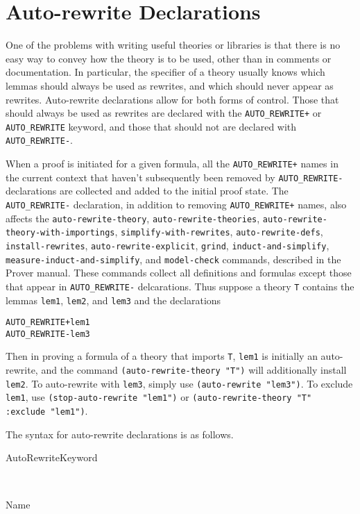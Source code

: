
\section{Auto-rewrite Declarations}
\label{auto-rewrite-decls}

One of the problems with writing useful theories or libraries is that
there is no easy way to convey how the theory is to be used, other than in
comments or documentation.  In particular, the specifier of a theory
usually knows which lemmas should always be used as rewrites, and which
should never appear as rewrites.  Auto-rewrite declarations allow for both
forms of control.  Those that should always be used as rewrites are
declared with the \texttt{AUTO\_REWRITE+} or \texttt{AUTO\_REWRITE}
keyword, and those that should not are declared with
\texttt{AUTO\_REWRITE-}.  

When a proof is initiated for a given formula, all the
\texttt{AUTO\_REWRITE+} names in the current context that haven't
subsequently been removed by \texttt{AUTO\_REWRITE-} declarations are
collected and added to the initial proof state.  The
\texttt{AUTO\_REWRITE-} declaration, in addition to removing
\texttt{AUTO\_REWRITE+} names, also affects the
\texttt{auto-rewrite-theory}, \texttt{auto-rewrite-theories},
\texttt{auto-rewrite-theory-with-importings},
\texttt{simplify-with-rewrites}, \texttt{auto-rewrite-defs},
\texttt{install-rewrites}, \texttt{auto-rewrite-explicit}, \texttt{grind},
\texttt{induct-and-simplify}, \texttt{measure-induct-and-simplify}, and
\texttt{model-check} commands, described in the Prover manual.  These
commands collect all definitions and formulas except those that appear in
\texttt{AUTO\_REWRITE-} delcarations.  Thus suppose a theory \texttt{T}
contains the lemmas \texttt{lem1}, \texttt{lem2}, and \texttt{lem3} and
the declarations
\begin{alltt}
  AUTO_REWRITE+ lem1
  AUTO_REWRITE- lem3
\end{alltt}
Then in proving a formula of a theory that imports \texttt{T},
\texttt{lem1} is initially an auto-rewrite, and the command
\texttt{(auto-rewrite-theory "T")} will additionally install
\texttt{lem2}.  To auto-rewrite with \texttt{lem3}, simply use
\texttt{(auto-rewrite "lem3")}.  To exclude \texttt{lem1}, use
\texttt{(stop-auto-rewrite "lem1")} or \texttt{(auto-rewrite-theory "T"
:exclude "lem1")}.

The syntax for auto-rewrite declarations is as follows.
\begin{bnf}
{AutoRewriteKeyword\ }

{\ \choice\ \ \choice\ }

{Name \opt{\lit{!} \opt{\lit{!}}} }
\end{bnf}

